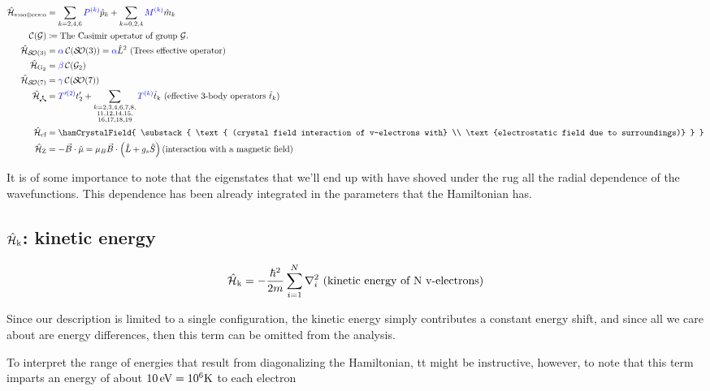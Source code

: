 \documentclass{article}
\begin{document}
\begin{mdframed}
\begin{align}
	\hamSOOplusECSOSymbol &= \hamSOOplusECSO \\ 
	\nonumber \casimir{\anyGroup} &\DEF \text{The Casimir operator of group $\anyGroup$.}\\ 
	\hamTreesSymbol &= \casimirAlpha\casimir{\SO{3}} = \casimirAlpha \op{L}^2 \text{ (Trees effective operator)} \\
	\hamGTwoSymbol      &= \casimirBeta\casimir{\Gtwo} \\
	\hamSOSevenSymbol   &= \casimirGamma\casimir{\SO{7}} \\
	\ham_{\trispoke} &= {\opcolor{T'^{(2)}}}t'_2 + \hamEffectiveThreeBody \text{ (effective 3-body operators $\op{t}_k$)} \\
	\hamCrystalFieldSymbol &= \hamCrystalField {   
		\substack{
			\text{ (crystal field interaction of v-electrons with} \\
			\text{electrostatic field due to surroundings)}
			} 
			}\\
    \hamZeemanSymbol &= -\vec{B} \cdot \op{\mu} = \hamZeeman \text{(interaction with a magnetic field)}
\label{The very effective Hamiltonian}
\end{align}  
\end{mdframed}

It is of some importance to note that the eigenstates that we'll end up with have shoved under the rug all the radial dependence of the wavefunctions. This dependence has been already integrated in the parameters that the Hamiltonian has. 

\subsection{$\hat{\mathcal{H}}_\text{k}$: kinetic energy}

    \begin{equation}
        \hat{\mathcal{H}}_\text{k} = -\frac{\hbar^2}{2m}\sum_{i=1}^N \nabla_i^2 \text{ (kinetic energy of N v-electrons)}
    \end{equation}

    Since our description is limited to a single configuration, the kinetic energy simply contributes a constant energy shift, and since all we care about are energy differences, then this term can be omitted from the analysis.
    
    To interpret the range of energies that result from diagonalizing the Hamiltonian, tt might be instructive, however, to note that this term imparts an energy of about $10\,\text{eV} = 10^6 \text{K}$ to each electron
\end{document}
